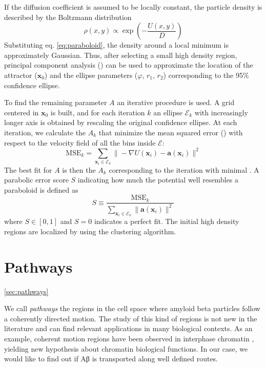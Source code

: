 If the diffusion coefficient is assumed to be locally constant, the particle density is described by the Boltzmann distribution
\begin{equation}
 \rho(x, y) \propto \exp\left(-\frac{U(x, y)}{D}\right)
\end{equation}
Substituting eq. \ref{eq:paraboloid}, the density around a local minimum is approximately Gaussian. Thus, after selecting a small high density region, principal component analysis () can be used to approximate the location of the attractor ($\bm{x}_0$) and the ellipse parameters ($\varphi$, $r_1$, $r_2$) corresponding to the 95\% confidence ellipse.

To find the remaining parameter $A$ an iterative procedure is used. A grid centered in $\bm{x}_0$ is built, and for each iteration $k$ an ellipse $\mathcal{E}_k$ with increasingly longer axis is obtained by rescaling the original confidence ellipse. At each iteration, we calculate the $A_k$ that minimize the mean squared error () with respect to the velocity field of all the bins inside $\mathcal{E}$:
\begin{equation}
 \mathrm{MSE}_k = \sum_{\bm{x}_i \in \mathcal{E}_k} \| -\nabla U(\bm{x}_i) - \bm{a}(\bm{x}_i) \|^2
\end{equation}
The best fit for $A$ is then the $A_k$ corresponding to the iteration with minimal .
A parabolic error score $S$ indicating how much the potential well resembles a paraboloid is defined as
\begin{equation}
 S \equiv \frac{\mathrm{MSE}_k}{\sum_{\bm{x}_i \in \mathcal{E}_k} \|\bm{a}(\bm{x}_i)\|^2}
\end{equation}
where $S \in [0, 1]$ and $S = 0$ indicates a perfect fit.
The initial high density regions are localized by using the  clustering algorithm.


\section{Pathways}\ref{sec:pathways}

We call \emph{pathways} the regions in the cell space where amyloid beta particles follow a coherently directed motion. The study of this kind of regions is not new in the literature and can find relevant applications in many biological contexts. As an example, coherent motion regions have been observed in interphase chromatin , yielding new hypothesis about chromatin biological functions. In our case, we would like to find out if Aβ is transported along well defined routes.

